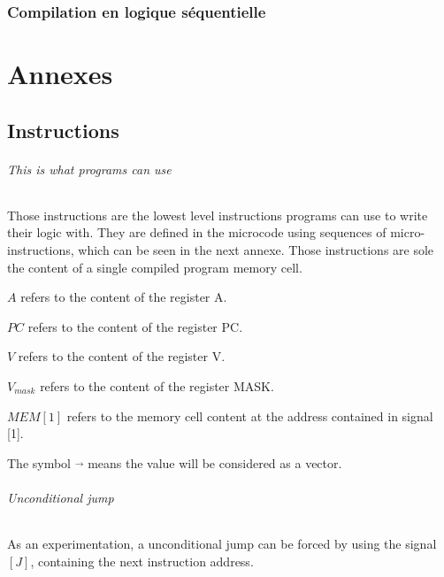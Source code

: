 \documentclass{scrreprt}
\begin{document}
     	\section{Compilation en logique séquentielle}

    \cleardoublepage
    \pagebreak
    \part{Annexes}
    
    
    \chapter{Instructions}
    \paragraph{This is what programs can use}
    Those instructions are the lowest level instructions programs can use to write their logic with. 
    They are defined in the microcode using sequences of micro- instructions, which can be seen in the next annexe.
    Those instructions are sole the content of a single compiled program memory cell.
    
    \textbf{$A$} refers to the content of the register A.
    
    \textbf{$PC$} refers to the content of the register PC.
    
    \textbf{$V$} refers to the content of the register V.
    
    \textbf{$V_{mask}$} refers to the content of the register MASK.
    
    \textbf{$MEM[1]$} refers to the memory cell content at the address contained in signal [1].
    
    The symbol $\vec{ }$ means the value will be considered as a vector.
    
    \paragraph{Unconditional jump}
    As an experimentation, a unconditional jump can be forced by using the signal $[J]$, containing the next instruction address. 
    
\end{document}
